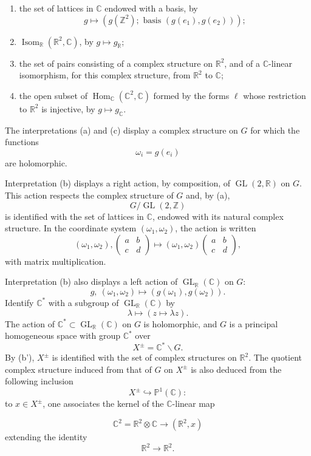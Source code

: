 \documentclass[10pt,a4paper]{article}
\providecommand{\GL}{\operatorname{GL}}
\providecommand{\Hom}{\operatorname{Hom}}
\providecommand{\Isom}{\operatorname{Isom}}
\providecommand{\R}{\mathbb R}
\providecommand{\Z}{\mathbb Z}
\providecommand{\C}{\mathbb C}
\begin{document}
\clearpage
{}
\hypertarget{authority-9}{}
\begin{enumerate}[label=(\alph*)]
\item the set of lattices in $\C$ endowed with a basis, by
\[
g\longmapsto (g(\Z^2);\text{ basis }(g(e_1),g(e_2)));
\]
\item $\Isom_{\R}(\R^2,\C)$, by $g\mapsto g_{\R}$;
\item[(b')] the set of pairs consisting of a complex structure on $\R^2$, and of a $\C$-linear isomorphism, for this complex structure, from $\R^2$ to $\C$;
\item[(c)] the open subset of $\Hom_{\C}(\C^2,\C)$ formed by the forms $\ell$ whose restriction to $\R^2$ is injective, by $g\mapsto g_{\C}$.
\end{enumerate}

The interpretations (a) and (c) display a complex structure on $G$ for which the functions
\[
\omega_i=g(e_i)
\]
are holomorphic.

Interpretation (b) displays a right action, by composition, of $\GL(2,\R)$ on $G$. This action respects the complex structure of $G$ and, by (a),
\[
G/\GL(2,\Z)
\]
is identified with the set of lattices in $\C$, endowed with its natural complex structure. In the coordinate system $(\omega_1,\omega_2)$, the action is written
\[
(\omega_1,\omega_2),
\begin{pmatrix}a&b\\ c&d\end{pmatrix}
\longmapsto
(\omega_1,\omega_2)\begin{pmatrix}a&b\\ c&d\end{pmatrix},
\]
with matrix multiplication.

Interpretation (b) also displays a left action of $\GL_{\R}(\C)$ on $G$:
\[
g,\ (\omega_1,\omega_2)\longmapsto(g(\omega_1),g(\omega_2)).
\]
Identify $\C^*$ with a subgroup of $\GL_{\R}(\C)$ by
\[
\lambda\longmapsto(z\longmapsto\lambda z).
\]
The action of $\C^*\subset\GL_{\R}(\C)$ on $G$ is holomorphic, and $G$ is a principal homogeneous space with group $\C^*$ over
\[
X^\pm=\C^*\backslash G.
\]
By (b'), $X^\pm$ is identified with the set of complex structures on $\R^2$. The quotient complex structure induced from that of $G$ on $X^\pm$ is also deduced from the following inclusion
\[
X^\pm\hookrightarrow\mathbb P^1(\C):
\]
to $x\in X^\pm$, one associates the kernel of the $\C$-linear map

\clearpage
{}
\hypertarget{authority-10}{}
\[
\C^2=\R^2\otimes\C\longrightarrow (\R^2,x)
\]
extending the identity
\[
\R^2\longrightarrow\R^2.
\]
\end{document}
